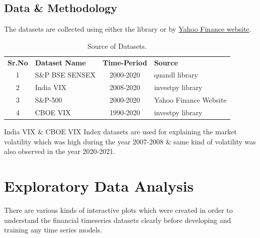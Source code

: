 \documentclass[conference]{IEEEtran}
\begin{document}
\subsection{Data \& Methodology}
The datasets are collected using either the library or by \href{https://cutt.ly/5b6Yn9L}{Yahoo Finance website}.
\vspace{-0.4cm}
\begin{table}[htbp]
	\caption{Source of Datasets.}
	\begin{tabular}{c l c l}
		\textbf{Sr.No} & \textbf{Dataset Name} & \textbf{Time-Period} & \textbf{Source}       \\
		1              & S\&P BSE SENSEX       & 2000-2020            & quandl library        \\
		2              & India VIX             & 2008-2020            & investpy library      \\
		3              & S\&P-500              & 2000-2020            & Yahoo Finance Website \\
		4              & CBOE VIX              & 1990-2020            & investpy library      
	\end{tabular}
\end{table}

India VIX \& CBOE VIX Index datasets are used for explaining the market volatility which was high during the year 2007-2008 \& same kind of volatility was also observed in the year 2020-2021.

\section{Exploratory Data Analysis}
There are various kinds of interactive plots which were created in order to understand the financial timeseries datasets clearly before developing and training any time series models.
\end{document}
